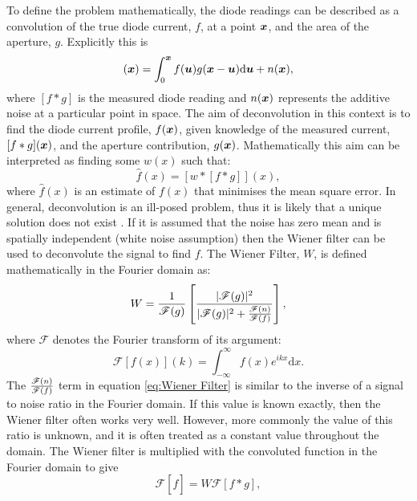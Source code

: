 To define the problem mathematically, the diode readings can be described as a convolution of the true diode current, $f$, at a point $\boldsymbol{x}$, and the area of the aperture, $g$.
Explicitly this is
\begin{equation}
[f*g](\bs{x}) = \int_0^{\bs{x}} f(\bs{u})g(\bs{x}-\bs{u})\mathrm{d}\bs{u} + n(\bs{x}),
\label{eq:Convolution equation with noise}
\end{equation}
where $[f*g]$ is the measured diode reading and $n(\boldsymbol{x})$ represents the additive noise at a particular point in space.
The aim of deconvolution in this context is to find the diode current profile, $f(\boldsymbol{x})$, given knowledge of the measured current, $[f*g](\boldsymbol{x})$, and the aperture contribution, $g(\boldsymbol{x})$.
Mathematically this aim can be interpreted as finding some $w(x)$ such that:
\begin{equation}
    \hat{f}(x) = [w * [f*g]](x),
    \label{eq:Wiener aim}
\end{equation}
where $\hat{f}(x)$ is an estimate of $f(x)$ that minimises the mean square error.
In general, deconvolution is an ill-posed problem, thus it is likely that a unique solution does not exist \cite{wolfram2016Deconvolution}.
If it is assumed that the noise has zero mean and is spatially independent (white noise assumption) then the Wiener filter \cite{wiener1949extrapolation} can be used to deconvolute the signal to find $f$.
The Wiener Filter, $W$, is defined mathematically in the Fourier domain as:
\begin{equation}
W = \frac{1}{\mathscr{F}(g)}\left[\frac{|\mathscr{F}(g)|^2}{|\mathscr{F}(g)|^2 + \frac{\mathscr{F}(n)}{\mathscr{F}(f)}}\right],
\label{eq:Wiener Filter}
\end{equation}
where $\mathscr{F}$ denotes the Fourier transform of its argument:
\begin{equation}
\mathscr{F}[f(x)](k) = \int_{-\infty}^{\infty} \! f(x) e^{ikx} \mathrm{d}x.
\label{eq:Classic Fourier Transform}
\end{equation}
The $\frac{\mathscr{F}(n)}{\mathscr{F}(f)}$ term in equation \ref{eq:Wiener Filter} is similar to the inverse of a signal to noise ratio in the Fourier domain.
If this value is known exactly, then the Wiener filter often works very well.
However, more commonly the value of this ratio is unknown, and it is often treated as a constant value throughout the domain.
\newline
The Wiener filter is multiplied with the convoluted function in the Fourier domain to give
\begin{equation}
\mathscr{F}[\widehat{f}] = W \mathscr{F}[f*g],
\label{eqwienapp}
\end{equation}
